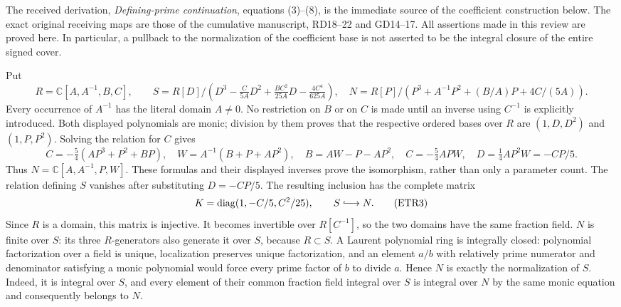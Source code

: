 \documentclass[11pt]{article}
\begin{document}
The received derivation, \emph{Defining-prime continuation}, equations
(3)--(8), is the immediate source of the coefficient construction below.
The exact original receiving maps are those of the cumulative manuscript,
RD18--22 and GD14--17. All assertions made in this review are proved here.
In particular, a pullback to the normalization of the coefficient base is
not asserted to be the integral closure of the entire signed cover.

Put
\[
 R=\mathbb C[A,A^{-1},B,C],\qquad
 S=R[D]/(D^3-\tfrac{C}{5A}D^2+\tfrac{BC^2}{25A}D
                         -\tfrac{4C^4}{625A}),
 \quad
 N=R[P]/(P^3+A^{-1}P^2+(B/A)P+4C/(5A)).                 \tag{ETR1}
\]
Every occurrence of $A^{-1}$ has the literal domain $A\ne0$.
No restriction on $B$ or on $C$ is made until an inverse using $C^{-1}$
is explicitly introduced. Both displayed polynomials are monic; division
by them proves that the respective ordered bases over $R$ are
$(1,D,D^2)$ and $(1,P,P^2)$. Solving the relation for $C$ gives
\[
 C=-\tfrac54(AP^3+P^2+BP),\quad
 W=A^{-1}(B+P+AP^2),\quad
 B=AW-P-AP^2,
 \quad C=-\tfrac54APW,\quad D=\tfrac14AP^2W=-CP/5.       \tag{ETR2}
\]
Thus $N=\mathbb C[A,A^{-1},P,W]$. These formulas and their displayed
inverses prove the isomorphism, rather than only a parameter count.
The relation defining $S$ vanishes after substituting $D=-CP/5$.
The resulting inclusion has the complete matrix
\[
 K=\operatorname{diag}(1,-C/5,C^2/25),\qquad
 S\lhook\joinrel\longrightarrow N.                    \tag{ETR3}
\]
Since $R$ is a domain, this matrix is injective. It becomes invertible
over $R[C^{-1}]$, so the two domains have the same fraction field.
$N$ is finite over $S$: its three $R$-generators also generate it over
$S$, because $R\subset S$. A Laurent polynomial ring is integrally
closed: polynomial factorization over a field is unique, localization
preserves unique factorization, and an element $a/b$ with relatively
prime numerator and denominator satisfying a monic polynomial would
force every prime factor of $b$ to divide $a$. Hence $N$ is exactly the
normalization of $S$. Indeed, it is integral over $S$, and every element
of their common fraction field integral over $S$ is integral over $N$
by the same monic equation and consequently belongs to $N$.
\end{document}
